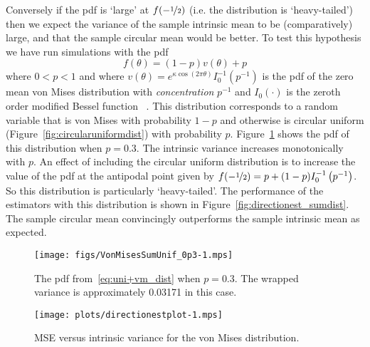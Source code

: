 \documentclass[journal]{../bib/IEEEtran}
\begin{document}
Conversely if the pdf is `large' at $f(-\nicefrac{1}{2})$  (i.e. the distribution is `heavy-tailed') then we expect the variance of the sample intrinsic mean to be (comparatively) large, and that the sample circular mean would be better. %
To test this hypothesis we have run simulations with the pdf
\begin{equation}\label{eq:uni+vm_dist}
f(\theta) = (1-p)v(\theta) + p
\end{equation}
where $0 < p < 1$ and where $v(\theta) = e^{\kappa\cos\left(2\pi \theta \right)}I_0^{-1}\left(p^{-1}\right)$ is the pdf of the zero mean von Mises distribution with \emph{concentration} $p^{-1}$ and $I_0(\cdot)$ is the zeroth order modified Bessel function \cite[Sec.~5.3]{McKilliam2010thesis}~\cite{Fisher1993,Mardia_directional_statistics}.  This distribution corresponds to a random variable that is von Mises with probability $1-p$ and otherwise is circular uniform (Figure~\ref{fig:circularuniformdist}) with probability $p$.  Figure~\ref{fig:pdf_sumunifvonmis} shows the pdf of this distribution when $p = 0.3$.  %
The intrinsic variance increases monotonically with $p$.  An effect of including the circular uniform distribution is to increase the value of the pdf at the antipodal point given by $f(-\nicefrac{1}{2}) = p + (1-p)I_0^{-1}\left(p^{-1}\right)$.  So this distribution is particularly `heavy-tailed'. The performance of the estimators with this distribution is shown in Figure~\ref{fig:directionest_sumdist}. The sample circular mean convincingly outperforms the sample intrinsic mean as expected.

\begin{figure}[tp]
	\centering
		\texttt{[image: figs/VonMisesSumUnif\_0p3-1.mps]}
		\caption{The pdf from~\eqref{eq:uni+vm_dist} when $p = 0.3$. The wrapped variance is approximately 0.03171 in this case.}
		\label{fig:pdf_sumunifvonmis}
\end{figure}

\begin{figure}[p]
	\centering
		\texttt{[image: plots/directionestplot-1.mps]}
		\caption{MSE versus intrinsic variance for the von Mises distribution.}
		\label{fig:directionest_VonMises}
\end{figure}
\end{document}
